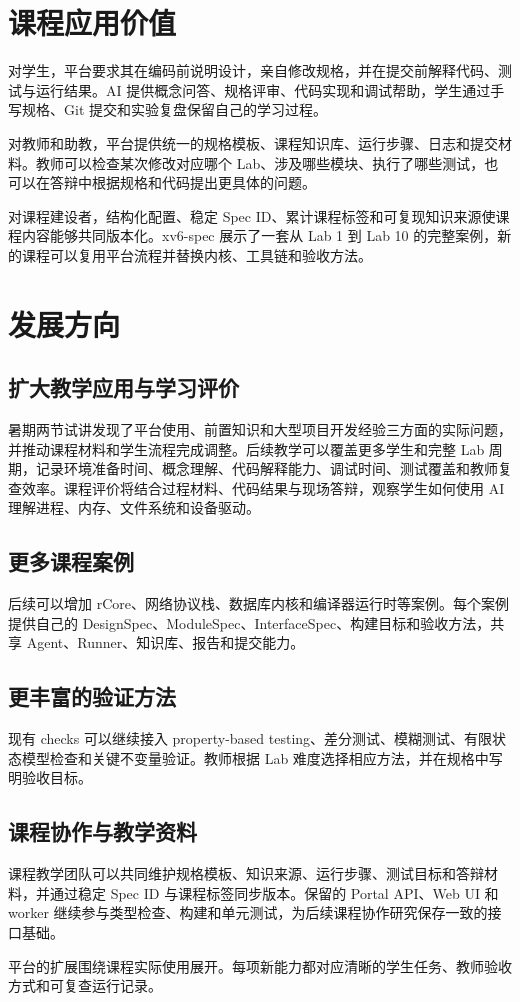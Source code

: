 \section{课程应用价值}

对学生，平台要求其在编码前说明设计，亲自修改规格，并在提交前解释代码、测试与运行结果。AI 提供概念问答、规格评审、代码实现和调试帮助，学生通过手写规格、Git 提交和实验复盘保留自己的学习过程。

对教师和助教，平台提供统一的规格模板、课程知识库、运行步骤、日志和提交材料。教师可以检查某次修改对应哪个 Lab、涉及哪些模块、执行了哪些测试，也可以在答辩中根据规格和代码提出更具体的问题。

对课程建设者，结构化配置、稳定 Spec ID、累计课程标签和可复现知识来源使课程内容能够共同版本化。xv6-spec 展示了一套从 Lab 1 到 Lab 10 的完整案例，新的课程可以复用平台流程并替换内核、工具链和验收方法。

\section{发展方向}

\subsection{扩大教学应用与学习评价}

暑期两节试讲发现了平台使用、前置知识和大型项目开发经验三方面的实际问题，并推动课程材料和学生流程完成调整。后续教学可以覆盖更多学生和完整 Lab 周期，记录环境准备时间、概念理解、代码解释能力、调试时间、测试覆盖和教师复查效率。课程评价将结合过程材料、代码结果与现场答辩，观察学生如何使用 AI 理解进程、内存、文件系统和设备驱动。

\subsection{更多课程案例}

后续可以增加 rCore、网络协议栈、数据库内核和编译器运行时等案例。每个案例提供自己的 DesignSpec、ModuleSpec、InterfaceSpec、构建目标和验收方法，共享 Agent、Runner、知识库、报告和提交能力。

\subsection{更丰富的验证方法}

现有 checks 可以继续接入 property-based testing、差分测试、模糊测试、有限状态模型检查和关键不变量验证。教师根据 Lab 难度选择相应方法，并在规格中写明验收目标。

\subsection{课程协作与教学资料}

课程教学团队可以共同维护规格模板、知识来源、运行步骤、测试目标和答辩材料，并通过稳定 Spec ID 与课程标签同步版本。保留的 Portal API、Web UI 和 worker 继续参与类型检查、构建和单元测试，为后续课程协作研究保存一致的接口基础。

\begin{keybox}[发展原则]
平台的扩展围绕课程实际使用展开。每项新能力都对应清晰的学生任务、教师验收方式和可复查运行记录。
\end{keybox}
